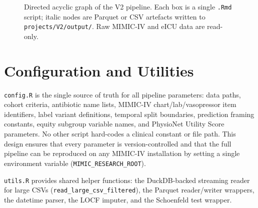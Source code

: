 \begin{figure}[H]
\caption{Directed acyclic graph of the V2 pipeline. Each box is a single
  \texttt{.Rmd} script; italic nodes are Parquet or CSV artefacts written to
  \texttt{projects/V2/output/}. Raw MIMIC-IV and eICU data are read-only.}
\label{fig:pipeline_dag}
\end{figure}

\section{Configuration and Utilities}

\texttt{config.R} is the single source of truth for all pipeline parameters:
data paths, cohort criteria, antibiotic name lists, MIMIC-IV chart/lab/vasopressor
item identifiers, label variant definitions, temporal split boundaries,
prediction framing constants, equity subgroup variable names, and
PhysioNet Utility Score parameters. No other script hard-codes a clinical
constant or file path. This design ensures that every parameter is version-controlled
and that the full pipeline can be reproduced on any MIMIC-IV installation by
setting a single environment variable (\texttt{MIMIC\_RESEARCH\_ROOT}).

\texttt{utils.R} provides shared helper functions: the DuckDB-backed
streaming reader for large CSVs (\texttt{read\_large\_csv\_filtered}), the
Parquet reader/writer wrappers, the datetime parser, the LOCF imputer, and
the Schoenfeld test wrapper.

